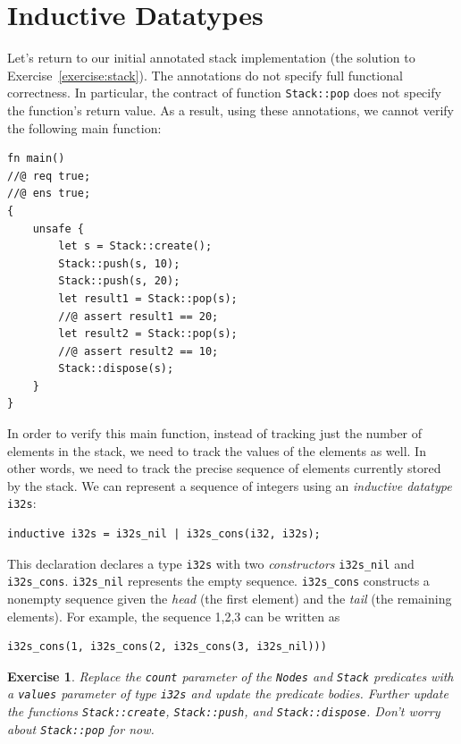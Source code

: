 \documentclass{article}
\newtheorem{exercise}{Exercise}
\begin{document}
\section{Inductive Datatypes}\label{section:datatypes}

Let's return to our initial annotated stack implementation (the
solution to Exercise~\ref{exercise:stack}). The annotations do
not specify full functional correctness. In particular, the
contract of function \lstinline!Stack::pop! does not specify the
function's return value. As a result, using these annotations,
we cannot verify the following main function:
\begin{lstlisting}
fn main()
//@ req true;
//@ ens true;
{
    unsafe {
        let s = Stack::create();
        Stack::push(s, 10);
        Stack::push(s, 20);
        let result1 = Stack::pop(s);
        //@ assert result1 == 20;
        let result2 = Stack::pop(s);
        //@ assert result2 == 10;
        Stack::dispose(s);
    }
}
\end{lstlisting}

In order to verify this main function, instead of tracking just
the number of elements in the stack, we need to track the
values of the elements as well. In other words, we need to
track the precise sequence of elements currently stored by the
stack. We can represent a sequence of integers using an
\emph{inductive datatype} \lstinline!i32s!:
\begin{lstlisting}
inductive i32s = i32s_nil | i32s_cons(i32, i32s);
\end{lstlisting}
This declaration declares a type \lstinline!i32s! with two
\emph{constructors} \lstinline!i32s_nil! and
\lstinline!i32s_cons!. \lstinline!i32s_nil! represents the
empty sequence. \lstinline!i32s_cons! constructs a nonempty
sequence given the \emph{head} (the first element) and the
\emph{tail} (the remaining elements). For example, the sequence
1,2,3 can be written as
\begin{lstlisting}
i32s_cons(1, i32s_cons(2, i32s_cons(3, i32s_nil)))
\end{lstlisting}

\begin{exercise}\label{exercise:values}
Replace the \lstinline!count! parameter of the
\lstinline!Nodes! and \lstinline!Stack! predicates with a
\lstinline!values! parameter of type \lstinline!i32s! and
update the predicate bodies. Further update the functions
\lstinline!Stack::create!, \lstinline!Stack::push!, and
\lstinline!Stack::dispose!. Don't worry about \lstinline!Stack::pop! for now.
\end{exercise}
\end{document}
